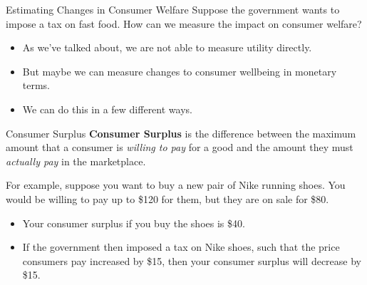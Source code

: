 \documentclass[11pt,t]{beamer}
\begin{document}
\begin{frame}{Estimating Changes in Consumer Welfare}
  Suppose the government wants to impose a tax on fast food. How can we measure the impact on consumer welfare?

  \begin{itemize}
    \item As we've talked about, we are not able to measure utility directly.

    \item But maybe we can measure changes to consumer wellbeing in monetary terms.

    \item We can do this in a few different ways.
  \end{itemize}
\end{frame}

\begin{frame}{Consumer Surplus}
  \textbf{Consumer Surplus} is the difference between the maximum amount that a consumer is \emph{willing to pay} for a good and the amount they must \emph{actually pay} in the marketplace.
  

  \bigskip\pause
  For example, suppose you want to buy a new pair of Nike running shoes. You would be willing to pay up to \$120 for them, but they are on sale for \$80. 

  \begin{itemize}
    \item Your consumer surplus if you buy the shoes is \$40.
    
    \item If the government then imposed a tax on Nike shoes, such that the price consumers pay increased by \$15, then your consumer surplus will decrease by \$15.
  \end{itemize}
\end{frame}
\end{document}
